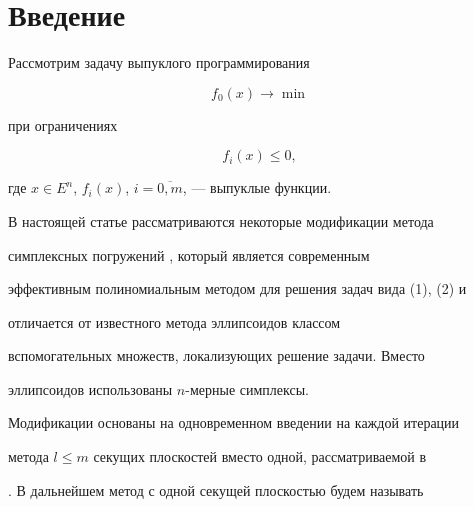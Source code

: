 \maketitle










\section*{Введение}





Рассмотрим задачу выпуклого программирования


\begin{equation}


f_0(x)\to \min


\end{equation}


при ограничениях


\begin{equation}


f_i(x)\le 0,


\end{equation}


где $x\in E^n$, $f_i(x)$, $i=\overline{0,m}$, --- выпуклые функции.





В настоящей статье рассматриваются некоторые модификации метода


симплексных погружений \cite{An}, который является современным


эффективным полиномиальным методом для решения задач вида (1), (2) и


отличается от известного метода эллипсоидов \cite{Pol} классом


вспомогательных множеств, локализующих решение задачи. Вместо


эллипсоидов использованы $n$-мерные симплексы.





Модификации основаны на одновременном введении на каждой итерации


метода $l\le m$ секущих плоскостей вместо одной, рассматриваемой в


\cite{An}. В дальнейшем метод с одной секущей плоскостью будем называть


